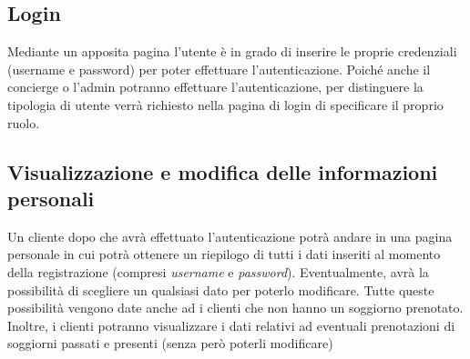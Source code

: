 \documentclass [a4paper, 12pt]{book}
\begin{document}
\medskip

\subsection{Login}
\label{Login}
Mediante un apposita pagina l'utente è in grado di inserire le proprie credenziali (username e password) per poter effettuare l'autenticazione. Poiché anche il concierge o l'admin potranno effettuare l'autenticazione, per distinguere la tipologia di utente verrà richiesto nella pagina di login di specificare il proprio ruolo.

\medskip

\subsection{Visualizzazione e modifica delle informazioni personali}
Un cliente dopo che avrà effettuato l'autenticazione potrà andare in una pagina personale in cui potrà ottenere un riepilogo di tutti i dati inseriti al momento della registrazione (compresi \textit{username} e \textit{password}). Eventualmente, avrà la possibilità di scegliere un qualsiasi dato per poterlo modificare. Tutte queste possibilità vengono date anche ad i clienti che non hanno un soggiorno prenotato. Inoltre, i clienti potranno visualizzare i dati relativi ad eventuali prenotazioni di soggiorni passati e presenti (senza però poterli modificare)

\medskip
\end{document}
